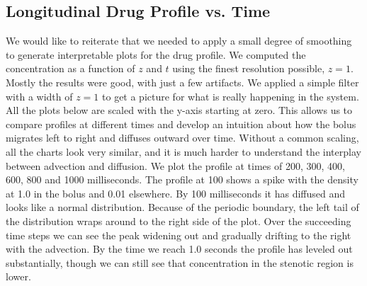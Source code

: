 \documentclass[11pt]{article} %
\begin{document}
\subsection{Longitudinal Drug Profile vs. Time}
We would like to reiterate that we needed to apply a small degree of smoothing
to generate interpretable plots for the drug profile.  
We computed the concentration as a function of $z$ and $t$ using the finest resolution
possible, $z=1$.  Mostly the results were good, with just a few artifacts.
We applied a simple filter with a width of $z=1$ to get a picture for what is really happening
in the system.  
All the plots below are scaled with the y-axis starting at zero.  
This allows us to compare profiles at different times and develop an intuition
about how the bolus migrates left to right and diffuses outward over time.
Without a common scaling, all the charts look very similar, and it is
much harder to understand the interplay between advection and diffusion.
We plot the profile at times of 200, 300, 400, 600, 800 and 1000 milliseconds.
The profile at 100 shows a spike with the density at 1.0 in the bolus and 0.01 elsewhere.
			By 100 milliseconds it has diffused and looks like a normal distribution.
			Because of the periodic boundary, the left tail of the distribution wraps around
			to the right side of the plot.  
			Over the succeeding time steps we can see the peak widening out and
			gradually drifting to the right with the advection.
			By the time we reach 1.0 seconds the profile has leveled out substantially,
			though we can still see that concentration in the stenotic region is lower.
\end{document}
